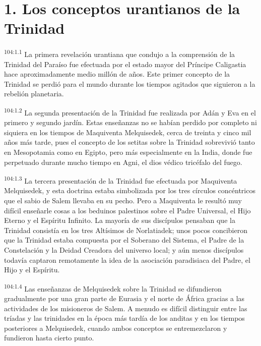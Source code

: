\documentclass[twoside, 11pt]{book}
\begin{document}
\section*{1. Los conceptos urantianos de la Trinidad}
\par
\textsuperscript{104:1.1} La primera revelación urantiana que condujo a la comprensión de la Trinidad del Paraíso fue efectuada por el estado mayor del Príncipe Caligastia hace aproximadamente medio millón de años. Este primer concepto de la Trinidad se perdió para el mundo durante los tiempos agitados que siguieron a la rebelión planetaria.

\par
\textsuperscript{104:1.2} La segunda presentación de la Trinidad fue realizada por Adán y Eva en el primero y segundo jardín. Estas enseñanzas no se habían perdido por completo ni siquiera en los tiempos de Maquiventa Melquisedek, cerca de treinta y cinco mil años más tarde, pues el concepto de los setitas sobre la Trinidad sobrevivió tanto en Mesopotamia como en Egipto, pero más especialmente en la India, donde fue perpetuado durante mucho tiempo en Agni, el dios védico tricéfalo del fuego.

\par
\textsuperscript{104:1.3} La tercera presentación de la Trinidad fue efectuada por Maquiventa Melquisedek, y esta doctrina estaba simbolizada por los tres círculos concéntricos que el sabio de Salem llevaba en su pecho. Pero a Maquiventa le resultó muy difícil enseñarle cosas a los beduinos palestinos sobre el Padre Universal, el Hijo Eterno y el Espíritu Infinito. La mayoría de sus discípulos pensaban que la Trinidad consistía en los tres Altísimos de Norlatiadek; unos pocos concibieron que la Trinidad estaba compuesta por el Soberano del Sistema, el Padre de la Constelación y la Deidad Creadora del universo local; y aún menos discípulos todavía captaron remotamente la idea de la asociación paradisiaca del Padre, el Hijo y el Espíritu.

\par
\textsuperscript{104:1.4} Las enseñanzas de Melquisedek sobre la Trinidad se difundieron gradualmente por una gran parte de Eurasia y el norte de África gracias a las actividades de los misioneros de Salem. A menudo es difícil distinguir entre las tríadas y las trinidades en la época más tardía de los anditas y en los tiempos posteriores a Melquisedek, cuando ambos conceptos se entremezclaron y fundieron hasta cierto punto.
\end{document}
